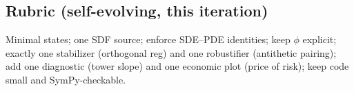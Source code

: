 ﻿\documentclass[11pt,letterpaper,oneside]{article}
\numberwithin{equation}{section}
\newcommand{\1}{\mathbf{1}}
\begin{document}
\subsection*{Rubric (self-evolving, this iteration)}
\begin{tcolorbox}[didacticstyle]
Minimal states; one SDF source; enforce SDE–PDE identities; keep $\phi$ explicit; exactly one stabilizer (orthogonal reg) and one robustifier (antithetic pairing); add one diagnostic (tower slope) and one economic plot (price of risk); keep code small and SymPy-checkable.
\end{tcolorbox}

\printbibliography[heading=bibintoc,title={References}]
\end{document}
